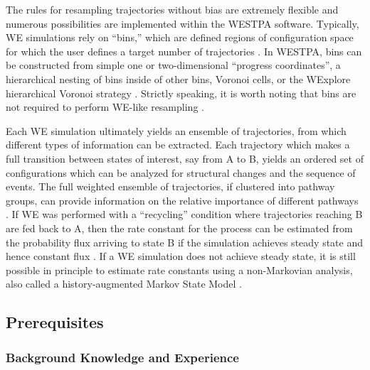 \documentclass[9pt,tutorial,ASAPversion]{livecoms}
\begin{document}
The rules for resampling trajectories without bias are extremely flexible \citep{Zhang2010} and numerous possibilities are implemented within the WESTPA software. 
Typically, WE simulations rely on “bins,” which are defined regions of configuration space for which the user defines a target number of trajectories \citep{HuberKim1996}. 
In WESTPA, bins can be constructed from simple one or two-dimensional “progress coordinates”, a hierarchical nesting of bins inside of other bins, Voronoi cells, or the WExplore hierarchical Voronoi strategy \citep{Zwier2015,Dickson2014}.
Strictly speaking, it is worth noting that bins are not required to perform WE-like resampling \citep{Dickson2018or19}.

Each WE simulation ultimately yields an ensemble of trajectories, from which different types of information can be extracted. 
Each trajectory which makes a full transition between states of interest, say from A to B, yields an ordered set of configurations which can be analyzed for structural changes and the sequence of events. 
The full weighted ensemble of trajectories, if clustered into pathway groups, can provide information on the relative importance of different pathways \citep{Ernesto2019}. 
If WE was performed with a “recycling” condition where trajectories reaching B are fed back to A, then the rate constant for the process can be estimated from the probability flux arriving to state B if the simulation achieves steady state and hence constant flux \citep{Divesh2010,ZuckermanChong2017}.
If a WE simulation does not achieve steady state, it is still possible in principle to estimate rate constants using a non-Markovian analysis, also called a history-augmented Markov State Model \cite{Ernesto2014,Upendra2019,Jeremy2019}.

\subsection{Prerequisites}

\subsubsection{Background Knowledge and Experience}
\end{document}

